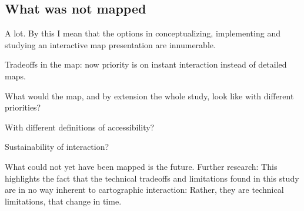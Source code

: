 \subsection{What was not mapped}

A lot. By this I mean that the options in
conceptualizing, implementing and studying an interactive map presentation are innumerable.

Tradeoffs in the map:
now priority is on instant interaction instead of detailed maps.

What would the map, and by extension the whole study, look like with different priorities?

With different definitions of accessibility?

Sustainability of interaction?

What could not yet have been mapped is the future.
Further research:
This highlights the fact that the technical tradeoffs and limitations found in this study
are in no way inherent to cartographic interaction:
Rather, they are technical limitations, that change in time.
